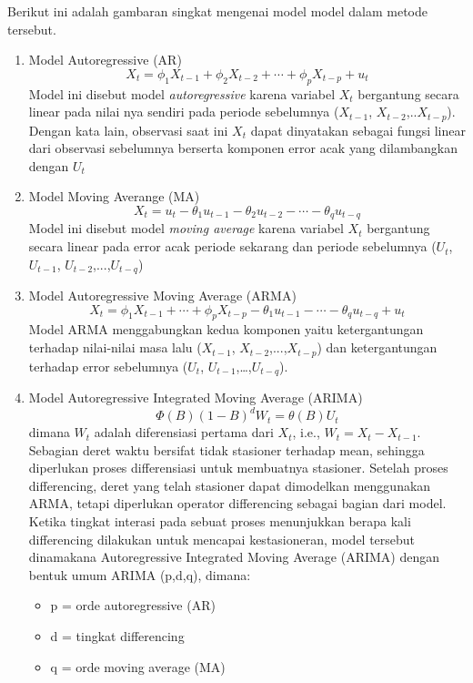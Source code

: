 Berikut ini adalah gambaran singkat mengenai model model dalam metode tersebut.
\begin{enumerate}
    \item Model Autoregressive (AR)
    \begin{equation}
        X_t = \phi_1 X_{t-1} + \phi_2 X_{t-2} + \cdots + \phi_p X_{t-p} + u_t
        \label{eq:ar_p_model}
    \end{equation}
    Model ini disebut model \textit{autoregressive} karena variabel $X_{t}$ bergantung secara linear pada nilai nya sendiri pada periode sebelumnya ($X_{t-1}$, $X_{t-2}$,..$X_{t-p}$). 
    Dengan kata lain, observasi saat ini $X_{t}$ dapat dinyatakan sebagai fungsi linear dari observasi sebelumnya berserta komponen error acak  yang dilambangkan dengan $U_{t}$
    \item Model Moving Averange (MA)
    \begin{equation}
        X_t = u_t - \theta_1 u_{t-1} - \theta_2 u_{t-2} - \cdots - \theta_q u_{t-q}
        \label{eq:ma_q_model}
    \end{equation}
    Model ini disebut model \textit{moving average} karena variabel $X_{t}$ bergantung secara linear pada error acak periode sekarang dan periode sebelumnya ($U_{t}$, $U_{t-1}$, $U_{t-2}$,...,$U_{t-q}$)
    \item Model Autoregressive Moving Average (ARMA)
    \begin{equation}
        X_t = \phi_1 X_{t-1} + \cdots + \phi_p X_{t-p} 
            - \theta_1 u_{t-1} - \cdots - \theta_q u_{t-q} + u_t
        \label{eq:arma_pq}
    \end{equation}
    Model ARMA menggabungkan kedua komponen yaitu ketergantungan terhadap nilai-nilai masa lalu ($X_{t-1}$, $X_{t-2}$,...,$X_{t-p}$) dan ketergantungan terhadap error sebelumnya ($U_{t}$, $U_{t-1}$,…,$U_{t-q}$).
    \item Model Autoregressive Integrated Moving Average (ARIMA)
    \begin{equation}
        \Phi(B)(1-B)^{d} W_{t} = \theta(B) U_{t}
        \label{eq:arma}
    \end{equation}
    dimana $W_{t}$ adalah diferensiasi pertama dari $X_{t}$, i.e., 
    $W_{t} = X_{t} - X_{t-1}$.
    Sebagian deret waktu bersifat tidak stasioner terhadap mean, sehingga diperlukan proses differensiasi untuk membuatnya stasioner. 
    Setelah proses differencing, deret yang telah stasioner dapat dimodelkan menggunakan ARMA, tetapi diperlukan operator differencing sebagai bagian dari model. 
    Ketika tingkat interasi pada sebuat proses menunjukkan berapa kali differencing dilakukan untuk mencapai kestasioneran, model tersebut dinamakana Autoregressive Integrated Moving Average (ARIMA) dengan bentuk umum ARIMA (p,d,q), dimana:
    \begin{itemize}
        \item p = orde autoregressive (AR)
        \item d = tingkat differencing
        \item q = orde moving average (MA)
    \end{itemize}
\end{enumerate}

